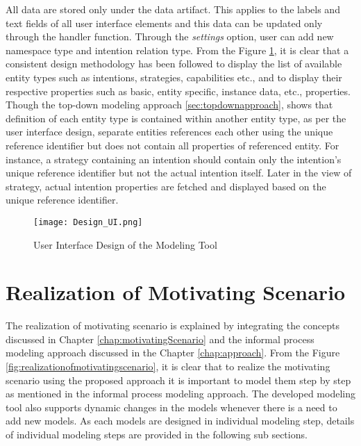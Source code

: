All data are stored only under the data artifact. This applies to the labels and text fields of all user interface elements and this data can be updated only through the handler function. Through the \textit{settings} option, user can add new namespace type and intention relation type. From the Figure \ref{fig:samplescreen}, it is clear that a consistent design methodology has been followed to display the list of available entity types such as intentions, strategies, capabilities etc., and to display their respective properties such as basic, entity specific, instance data, etc., properties. Though the top-down modeling approach \ref{sec:topdownapproach}, shows that definition of each entity type is contained within another entity type, as per the user interface design, separate entities references each other using the unique reference identifier but does not contain all properties of referenced entity. For instance, a strategy containing an intention should contain only the intention's unique reference identifier but not the actual intention itself. Later in the view of strategy, actual intention properties are fetched and displayed based on the unique reference identifier. 

\begin{figure}
	\centering
	\texttt{[image: Design\_UI.png]}
	\caption{User Interface Design of the Modeling Tool}
	\label{fig:samplescreen}
\end{figure}



\section{Realization of Motivating Scenario}
\label{sec:realization}
The realization of motivating scenario is explained by integrating the concepts discussed in Chapter \ref{chap:motivatingScenario} and the informal process modeling approach discussed in the Chapter \ref{chap:approach}. From the Figure \ref{fig:realizationofmotivatingscenario}, it is clear that to realize the motivating scenario using the proposed approach it is important to model them step by step as mentioned in the informal process modeling approach. The developed modeling tool also supports dynamic changes in the models whenever there is a need to add new models. As each models are designed in individual modeling step, details of individual modeling steps are provided in the following sub sections. 


